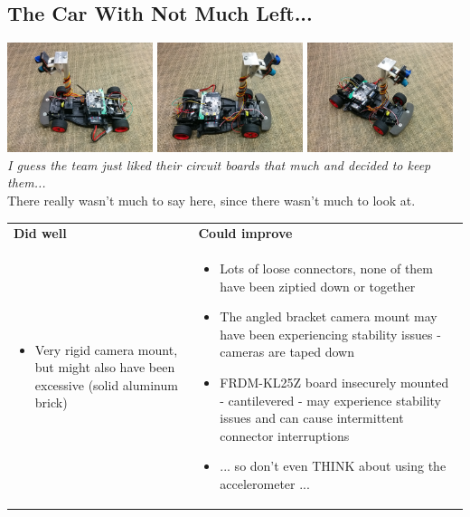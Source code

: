 \documentclass{article}
\begin{document}
\subsection{The Car With Not Much Left...}
{\centering
\includegraphics[width=0.32\textwidth]{images-dis2-carcritiques/barecar-side1}
\includegraphics[width=0.32\textwidth]{images-dis2-carcritiques/barecar-side2}
\includegraphics[width=0.32\textwidth]{images-dis2-carcritiques/barecar-angle} \\
\textit{I guess the team just liked their circuit boards that much and decided to keep them...} \\
There really wasn't much to say here, since there wasn't much to look at. \\}

\begin{tabularx}{\textwidth}{X X}
\textbf{Did well} & \textbf{Could improve} \\
\begin{itemize}
  \item Very rigid camera mount, but might also have been excessive (solid aluminum brick)
\end{itemize}
&
\begin{itemize}
  \item Lots of loose connectors, none of them have been ziptied down or together
  \item The angled bracket camera mount may have been experiencing stability issues - cameras are taped down
  \item FRDM-KL25Z board insecurely mounted - cantilevered - may experience stability issues and can cause intermittent connector interruptions
  \item ... so don't even THINK about using the accelerometer ...
\end{itemize}
\end{tabularx}
\end{document}
